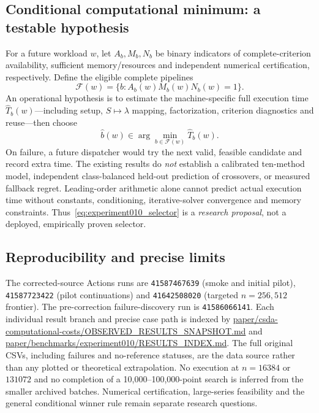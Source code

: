 \subsection{Conditional computational minimum: a testable hypothesis}
For a future workload $w$, let $A_b,M_b,N_b$ be binary indicators
of complete-criterion availability, sufficient memory/resources and
independent numerical certification, respectively. Define the eligible
complete pipelines
\begin{equation}
\mathcal F(w)=
\{b:A_b(w)M_b(w)N_b(w)=1\}.
\end{equation}
An operational hypothesis is to estimate the machine-specific
full execution time $\widehat T_b(w)$---including setup,
$S\mapsto\lambda$ mapping, factorization, criterion
diagnostics and reuse---then choose
\begin{equation}\label{eq:experiment010_selector}
\widehat b(w)\in\arg\min_{b\in\mathcal F(w)}\widehat T_b(w).
\end{equation}
On failure, a future dispatcher would try the next
valid, feasible candidate and record extra time.
The existing results do \emph{not} establish a calibrated
ten-method model, independent class-balanced held-out
prediction of crossovers, or measured fallback regret.
Leading-order arithmetic alone cannot predict actual
execution time without constants, conditioning,
iterative-solver convergence and memory constraints.
Thus~\eqref{eq:experiment010_selector} is a \emph{research
proposal}, not a deployed, empirically proven selector.

\subsection{Reproducibility and precise limits}
The corrected-source Actions runs are
\texttt{41587467639} (smoke and initial pilot),
\texttt{41587723422} (pilot continuations) and
\texttt{41642508020} (targeted $n=256,512$ frontier).
The pre-correction failure-discovery run is
\texttt{41586066141}. Each individual result branch
and precise case path is indexed by
\url{paper/csda-computational-costs/OBSERVED_RESULTS_SNAPSHOT.md}
and \url{paper/benchmarks/experiment010/RESULTS_INDEX.md}.
The full original CSVs, including failures and no-reference
statuses, are the data source rather than any plotted
or theoretical extrapolation. No execution at
$n=16384$ or $131072$ and no completion of a
10,000--100,000-point search is inferred from the
smaller archived batches. Numerical certification,
large-series feasibility and the general conditional
winner rule remain separate research questions.
